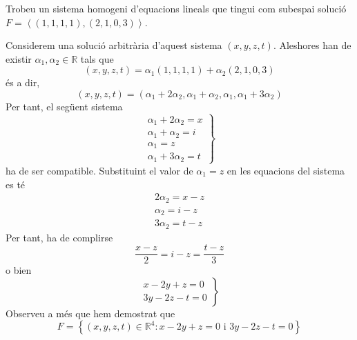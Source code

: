 \begin{exercici}
Trobeu un sistema homogeni d'equacions lineals que tingui com
subespai solució $F=\left\langle
(1,1,1,1),(2,1,0,3)\right\rangle $.

\end{exercici}
\begin{solucio}
Considerem una solució arbitrària d’aquest sistema $(x,y,z,t)$.
Aleshores han de existir $\alpha _{1},\alpha _{2}\in \mathbb{R}$ tals que%
\begin{equation*}
(x,y,z,t)=\alpha _{1}(1,1,1,1)+\alpha _{2}(2,1,0,3)
\end{equation*}%
és a dir,%
\begin{equation*}
(x,y,z,t)=(\alpha _{1}+2\alpha _{2},\alpha _{1}+\alpha _{2},\alpha
_{1},\alpha _{1}+3\alpha _{2})
\end{equation*}%
Per tant, el següent sistema%
\begin{equation*}
\left.
\begin{array}{r}
\alpha _{1}+2\alpha _{2}=x \\
\alpha _{1}+\alpha _{2}=i \\
\alpha _{1}=z \\
\alpha _{1}+3\alpha _{2}=t%
\end{array}%
\right\}
\end{equation*}%
ha de ser compatible. Substituint el valor de $\alpha _{1}=z$ en les
equacions del sistema es té%
\begin{equation*}
\begin{array}{r}
2\alpha _{2}=x-z \\
\alpha _{2}=i-z \\
3\alpha _{2}=t-z%
\end{array}%
\end{equation*}%
Per tant, ha de complirse%
\begin{equation*}
\frac{x-z}{2}=i-z=\frac{t-z}{3}
\end{equation*}%
o bien%
\begin{equation*}
\left.
\begin{array}{r}
x-2y+z=0 \\
3y-2z-t=0%
\end{array}%
\right\}
\end{equation*}%
Observeu a més que hem demostrat que%
\begin{equation*}
F=\left\{ (x,y,z,t)\in \mathbb{R}^{4}:x-2y+z=0\text{ i }3y-2z-t=0\right\}
\end{equation*}
\end{solucio}

